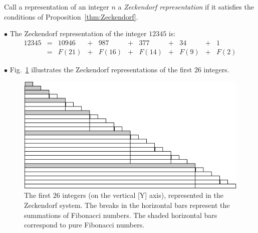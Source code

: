 \medskip

\noindent {}

\bigskip


\noindent
Call a representation of an integer $n$ a {\it Zeckendorf representation} if it satisfies the conditions of Proposition~\ref{thm:Zeckendorf}.

\medskip


\noindent $\bullet$
The Zeckendorf representation of the integer $12345$ is:
\[ \begin{array}{ccccccccccc}
12345 & =  & 10946 & + & 987    & +  &   377  & + & 34   & + & 1 \\
           & =  & F(21)  & + & F(16)  & +  & F(14) & + & F(9) & + & F(2)
\end{array} \]     

\medskip

\noindent $\bullet$
Fig.~\ref{fig:zeckendorf} illustrates the Zeckendorf representations of the first $26$ integers. 
\begin{figure}[h]
\begin{center}
        \includegraphics[scale=0.5]{FiguresArithmetic/Zeckendorf}
        \caption{The first $26$ integers (on the vertical [Y] axis), represented in the Zeckendorf system.  The breaks in the horizontal bars represent the summations of Fibonacci numbers.  The shaded horizontal bars correspond to pure Fibonacci numbers.}
\label{fig:zeckendorf}
\end{center}
\end{figure}

